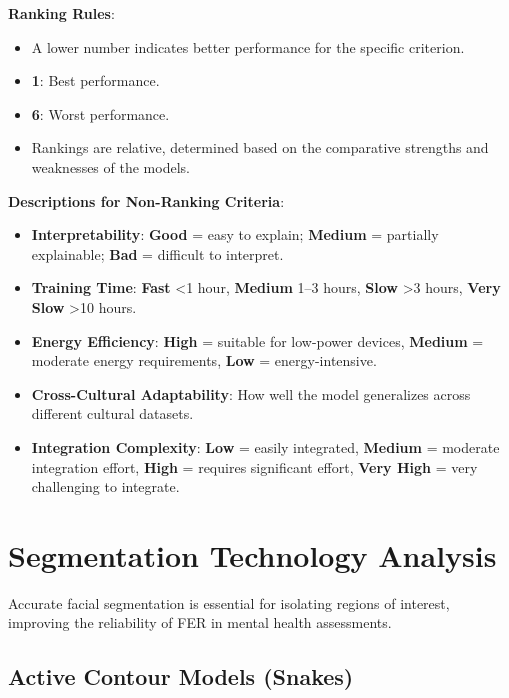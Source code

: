 \documentclass[lettersize,journal]{IEEEtran}
\begin{document}
\begin{table}[H]
\begin{flushleft}
\textbf{Ranking Rules}: 
\begin{itemize}
    \item A lower number indicates better performance for the specific criterion.
    \item \textbf{1}: Best performance.
    \item \textbf{6}: Worst performance.
    \item Rankings are relative, determined based on the comparative strengths and weaknesses of the models.
\end{itemize}
\textbf{Descriptions for Non-Ranking Criteria}:
\begin{itemize}
    \item \textbf{Interpretability}: \textbf{Good} = easy to explain; \textbf{Medium} = partially explainable; \textbf{Bad} = difficult to interpret.
    \item \textbf{Training Time}: \textbf{Fast} <1 hour, \textbf{Medium} 1--3 hours, \textbf{Slow} >3 hours, \textbf{Very Slow} >10 hours.
    \item \textbf{Energy Efficiency}: \textbf{High} = suitable for low-power devices, \textbf{Medium} = moderate energy requirements, \textbf{Low} = energy-intensive.
    \item \textbf{Cross-Cultural Adaptability}: How well the model generalizes across different cultural datasets.
    \item \textbf{Integration Complexity}: \textbf{Low} = easily integrated, \textbf{Medium} = moderate integration effort, \textbf{High} = requires significant effort, \textbf{Very High} = very challenging to integrate.
\end{itemize}
\end{flushleft}

\end{table}

\section{Segmentation Technology Analysis}
\label{sec:segmentation_analysis}

Accurate facial segmentation is essential for isolating regions of interest, improving the reliability of FER in mental health assessments.

\subsection{Active Contour Models (Snakes)}
\end{document}
